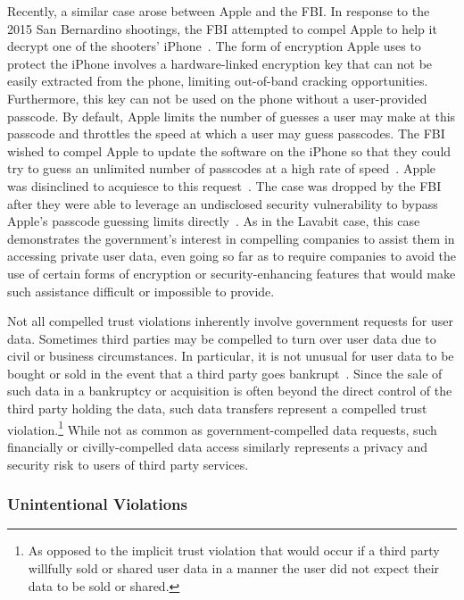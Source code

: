 Recently, a similar case arose between Apple and the FBI. In response
to the 2015 San Bernardino shootings, the FBI attempted to compel
Apple to help it decrypt one of the shooters'
iPhone~\cite{ars-cookvfbi}. The form of encryption Apple uses to
protect the iPhone involves a hardware-linked encryption key that can
not be easily extracted from the phone, limiting out-of-band cracking
opportunities. Furthermore, this key can not be used on the phone
without a user-provided passcode. By default, Apple limits the number
of guesses a user may make at this passcode and throttles the speed at
which a user may guess passcodes. The FBI wished to compel Apple to
update the software on the iPhone so that they could try to guess an
unlimited number of passcodes at a high rate of
speed~\cite{eff-applecrypto}. Apple was disinclined to acquiesce to
this request~\cite{apple-fbiletter}. The case was dropped by the FBI
after they were able to leverage an undisclosed security vulnerability
to bypass Apple's passcode guessing limits
directly~\cite{ars-fbi-breakthrough, ars-fbi-greyhats}. As in the
Lavabit case, this case demonstrates the government's interest in
compelling companies to assist them in accessing private user data,
even going so far as to require companies to avoid the use of certain
forms of encryption or security-enhancing features that would make
such assistance difficult or impossible to provide.

Not all compelled trust violations inherently involve government
requests for user data. Sometimes third parties may be compelled to
turn over user data due to civil or business circumstances. In
particular, it is not unusual for user data to be bought or sold in
the event that a third party goes bankrupt~\cite{nguyen2004,
  singer2015, solove2015}. Since the sale of such data in a bankruptcy
or acquisition is often beyond the direct control of the third party
holding the data, such data transfers represent a compelled trust
violation.\footnote{As opposed to the implicit trust violation that
  would occur if a third party willfully sold or shared user data in a
  manner the user did not expect their data to be sold or shared.}
While not as common as government-compelled data requests, such
financially or civilly-compelled data access similarly represents a
privacy and security risk to users of third party services.

\subsubsection{Unintentional Violations}

